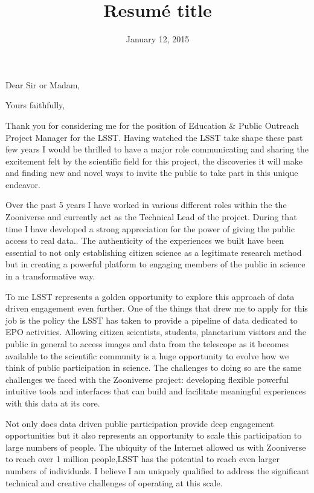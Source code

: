 \documentclass[11pt,a4paper,sans]{moderncv}        %
\title{Resumé title}                               %
\begin{document}

\date{January 12, 2015}
\opening{Dear Sir or Madam,}
\closing{Yours faithfully,}
\makelettertitle

Thank you for considering me for the position of Education \& Public Outreach Project Manager for the LSST. Having watched the LSST take shape these past few years I would be thrilled to have a major role communicating and sharing the excitement felt by the scientific field for this project, the discoveries it will make and finding new and novel ways to invite the public to take part in this unique endeavor. 

Over the past 5 years I have worked in various different roles within
the the Zooniverse and currently act as the Technical Lead of the project. During that time I have developed a strong appreciation for the power of giving the public access to real data.. The authenticity of the experiences we built have been essential to not only establishing citizen science as a legitimate research method but in creating a powerful platform to engaging members of the public in science in a transformative way.

To me LSST represents a golden opportunity to explore this approach of data driven engagement even further. One of the things that drew me to apply for this job is the policy the LSST has taken to provide a pipeline of data dedicated to EPO activities. Allowing citizen scientists, students, planetarium visitors and the public in general to access images and data from the telescope as it becomes
 available to the scientific community is a huge opportunity to evolve how we think of public participation in science. The challenges to doing so are the same challenges we faced with the Zooniverse project: developing flexible powerful intuitive tools and interfaces that can build and facilitate meaningful experiences with this data at its core. 
  
Not only does data driven public participation provide deep engagement opportunities but it also represents an opportunity to scale this participation to large numbers of people. The ubiquity of the Internet allowed us with Zooniverse to reach over 1 million people,LSST has the potential to reach even larger numbers of individuals. I believe I am uniquely qualified to address the significant technical
and creative challenges of operating at this scale.
\end{document}

